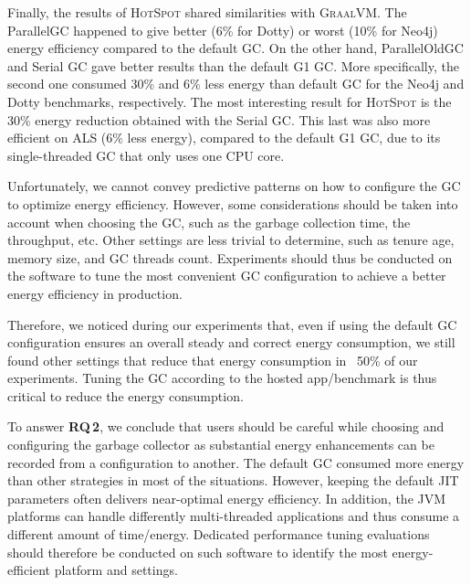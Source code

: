 Finally, the results of \textsc{HotSpot} shared similarities with \textsc{GraalVM}.
The \textsf{ParallelGC} happened to give better (6\% for \textsf{Dotty}) or worst (10\% for \textsf{Neo4j}) energy efficiency compared to the default GC.
On the other hand, \textsf{ParallelOldGC} and \textsf{Serial} GC gave better results than the default G1 GC.
More specifically, the second one consumed 30\% and 6\% less energy than default GC for the \textsf{Neo4j} and \textsf{Dotty} benchmarks, respectively.
The most interesting result for \textsc{HotSpot} is the 30\% energy reduction obtained with the \textsf{Serial} GC.
This last was also more efficient on ALS (6\% less energy), compared to the default G1 GC, due to its single-threaded GC that only uses one CPU core.

Unfortunately, we cannot convey predictive patterns on how to configure the GC to optimize energy efficiency.
However, some considerations should be taken into account when choosing the GC, such as the garbage collection time, the throughput, etc.
Other settings are less trivial to determine, such as tenure age, memory size, and GC threads count.
Experiments should thus be conducted on the software to tune the most convenient GC configuration to achieve a better energy efficiency in production.

Therefore, we noticed during our experiments that, even if using the default GC configuration ensures an overall steady and correct energy consumption, we still found other settings that reduce that energy consumption in ~50\% of our experiments.
Tuning the GC according to the hosted app/benchmark is thus critical to reduce the energy consumption.

\bigbreak
\begin{mdframed}[]
    To answer \textbf{RQ\,2}, we conclude that users should be careful while choosing and configuring the garbage collector as substantial energy enhancements can be recorded from a configuration to another.
    The default GC consumed more energy than other strategies in most of the situations.
    However, keeping the default JIT parameters often delivers near-optimal energy efficiency.
    In addition, the JVM platforms can handle differently multi-threaded applications and thus consume a different amount of time/energy.
    Dedicated performance tuning evaluations should therefore be conducted on such software to identify the most energy-efficient platform and settings.
\end{mdframed}


